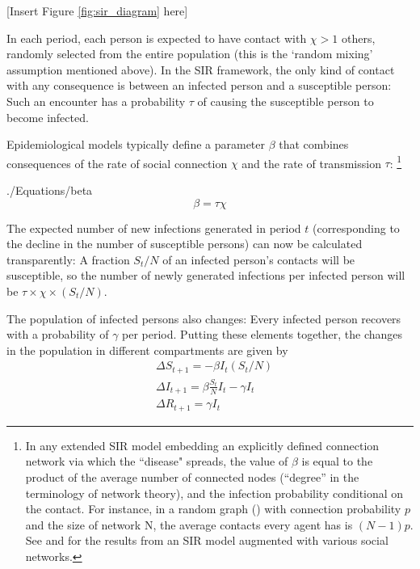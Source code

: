 [Insert Figure \ref{fig:sir_diagram} here]


\newcommand{\contactNum}{\chi}
\newcommand{\tranProb}{\tau}
\newcommand{\exposures}{\mathcal{E}}

In each period, each person is expected to have contact with $\contactNum>1$ others, randomly selected from the entire population (this is the `random mixing' assumption mentioned above).  In the SIR framework, the only kind of contact with any consequence is between an infected person and a susceptible person: Such an encounter has a probability $\tranProb$ of causing the susceptible person to become infected.

Epidemiological models typically define a parameter $\beta$ that combines consequences of the rate of social connection $\contactNum$ and the rate of transmission $\tranProb$:
\footnote{In any extended SIR model embedding an explicitly defined connection network via which the ``disease" spreads, the value of $\beta$ is equal to the product of the average number of connected nodes (``degree'' in the terminology of network theory), and the infection probability conditional on the contact. For instance, in a random graph (\cite{erdos1960evolution})  with connection probability $p$ and the size of network N, the average contacts every agent has is $(N-1)p$. See \cite{newman2002spread} and  \cite{jackson_social_2010} for the results from an SIR model augmented with various social networks.}

\begin{verbatimwrite}{./Equations/beta}
\begin{equation}
	\label{eq:beta}
    \beta  = \tranProb \contactNum
\end{equation}
\end{verbatimwrite}


The expected number of new infections generated in period $t$ (corresponding to the decline in the number of susceptible persons) can now be calculated transparently: A fraction $S_{t}/N$ of an infected person's contacts will be susceptible, so the number of newly generated infections per infected person will be $\tranProb \times \contactNum \times (S_{t}/N).$

The population of infected persons also changes: Every infected person recovers with a probability of $\gamma$ per period.  Putting these elements together, the  changes in the population in different compartments are given by
\begin{equation}
	\label{eq:sirdyn}
	\begin{split}
	&	\Delta S_{t+1} = -\beta I_{t}(S_{t}/N) \\
	&	\Delta I_{t+1} = \beta \frac{S_{t}}{N}I_{t} - \gamma I_t \\
&		\Delta R_{t+1} = \gamma I_t
	\end{split}
\end{equation}

